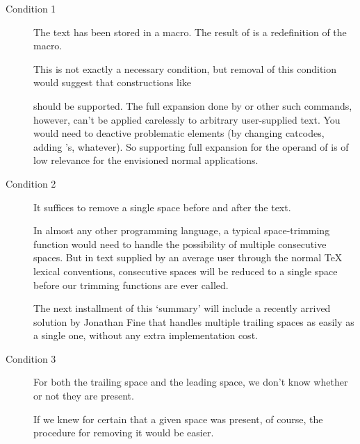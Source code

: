 \begin{description}
\item[Condition 1] The text has been stored in a macro. The result of
\cmd{\trimspaces} is a redefinition of the macro.

This is not exactly a necessary condition, but removal of this
condition would suggest that constructions like
\begin{lcode}
  \def\foo#1{...
    \message{Your argument "\trimspaces{#1}" makes me laugh}%
    ...}
\end{lcode}
should be supported. The full expansion done by \cmd{\message} or other such
commands, however, can't be applied carelessly to arbitrary
user-supplied text. You would need to deactive problematic elements
(by changing catcodes, adding \cmd{\protect}'s, whatever). So supporting
full expansion for the operand of \cmd{\trimspaces} is of low relevance for
the envisioned normal applications.

\item[Condition 2] It suffices to remove a single space before and after the
text.

In almost any other programming language, a typical space-trimming
function would need to handle the possibility of multiple consecutive
spaces. But in text supplied by an average user through the normal TeX
lexical conventions, consecutive spaces will be reduced to a single
space before our trimming functions are ever called.

The next installment of this `summary' will include a recently arrived
solution by Jonathan Fine 
that handles multiple trailing spaces as
easily as a single one, without any extra implementation cost.

\item[Condition 3] For both the trailing space and the leading space, we
don't know whether or not they are present.

If we knew for certain that a given space was present, of course, the
procedure for removing it would be easier.
\end{description}

